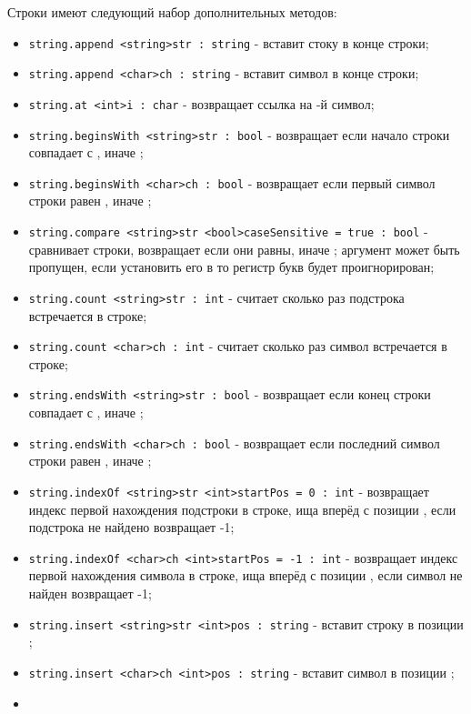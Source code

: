 \documentclass[a4paper, 14pt]{extarticle}
\newenvironment{icItems}
	{ \begin{itemize} [noitemsep,nolistsep] }
	{ \end{itemize} }
\begin{document}
Строки имеют следующий набор дополнительных методов:
\begin{icItems}
\item
	\lstinline|string.append <string>str : string| - вставит стоку в конце строки;
\item
	\lstinline|string.append <char>ch : string| - вставит символ в конце строки;
\item
	\lstinline|string.at <int>i : char| - возвращает ссылка на -й символ;
\item
	\lstinline|string.beginsWith <string>str : bool| - возвращает \true если начало строки совпадает с , иначе \false;
\item
	\lstinline|string.beginsWith <char>ch : bool|  - возвращает \true если первый символ строки равен  , иначе \false;
\item
	\lstinline|string.compare <string>str <bool>caseSensitive = true : bool| - сравнивает строки, возвращает \true если они равны, иначе \false; аргумент  может быть пропущен, если установить его в \false то регистр букв будет проигнорирован;
\item
	\lstinline|string.count <string>str : int| - считает сколько раз подстрока  встречается в строке;
\item
	\lstinline|string.count <char>ch : int| - считает сколько раз символ  встречается в строке;
\item
	\lstinline|string.endsWith <string>str : bool| - возвращает \true если конец строки совпадает с , иначе \false;
\item
	\lstinline|string.endsWith <char>ch : bool| - возвращает \true если последний символ строки равен , иначе \false;
\item
	\lstinline|string.indexOf <string>str <int>startPos = 0 : int| - возвращает индекс первой нахождения подстроки  в строке, ища вперёд с позиции , если подстрока не найдено возвращает -1;
\item
	\lstinline|string.indexOf <char>ch <int>startPos = -1 : int| - возвращает индекс первой нахождения символа  в строке, ища вперёд с позиции , если символ не найден возвращает -1;
\item
	\lstinline|string.insert <string>str <int>pos : string| - вставит строку  в позиции ;
\item
	\lstinline|string.insert <char>ch <int>pos : string| - вставит символ  в позиции ;
\item

\end{icItems}
\end{document}
